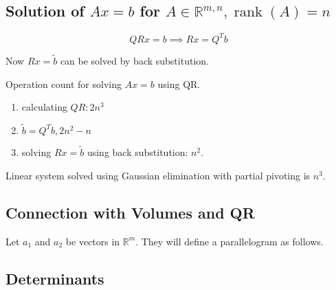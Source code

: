 \documentclass{report}
\newcommand{\R}{\mathbb{R}}
\def \rank {\operatorname{rank}}
\theoremstyle{definition}
\theoremstyle{remark}
\numberwithin{equation}{section}
\begin{document}
\subsection{Solution of $Ax = b$ for $A \in \R^{m, n}, \rank(A) = n$}
\[QRx = b \implies Rx = Q^Tb\]

Now $Rx = \tilde{b}$ can be solved by back substitution.

Operation count for solving $Ax = b$ using QR.
\begin{enumerate}
    \item calculating $QR: 2n^3$
    \item $\tilde{b} = Q^Tb, 2n^2 - n$
    \item solving $Rx = \tilde{b}$ using back substitution: $n^2$.
\end{enumerate}
Linear system solved using Gaussian elimination with partial pivoting is $n^3$.

\subsection{Connection with Volumes and QR}
Let $a_1$ and $a_2$ be vectors in $\R^m$. They will define a parallelogram as follows.

\subsection{Determinants}
\end{document}

